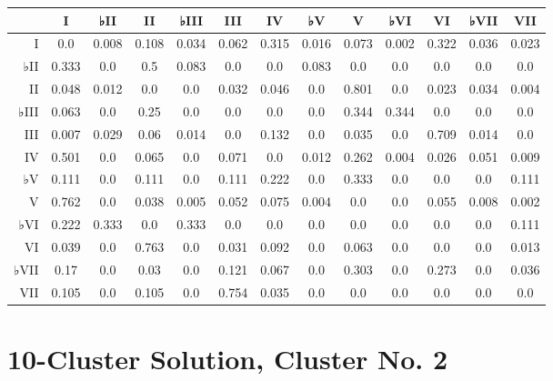 \begin{table}[htbp]
\begin{minipage}{\linewidth}
\setlength{\tymax}{0.5\linewidth}
\centering
\small
\begin{tabulary}{\textwidth}{@{}RCCCCCCCCCCCC@{}} \toprule
&I&♭II&II&♭III&III&IV&♭V&V&♭VI&VI&♭VII&VII\\
\midrule
I&0.0&0.008&0.108&0.034&0.062&0.315&0.016&0.073&0.002&0.322&0.036&0.023\\
♭II&0.333&0.0&0.5&0.083&0.0&0.0&0.083&0.0&0.0&0.0&0.0&0.0\\
II&0.048&0.012&0.0&0.0&0.032&0.046&0.0&0.801&0.0&0.023&0.034&0.004\\
♭III&0.063&0.0&0.25&0.0&0.0&0.0&0.0&0.344&0.344&0.0&0.0&0.0\\
III&0.007&0.029&0.06&0.014&0.0&0.132&0.0&0.035&0.0&0.709&0.014&0.0\\
IV&0.501&0.0&0.065&0.0&0.071&0.0&0.012&0.262&0.004&0.026&0.051&0.009\\
♭V&0.111&0.0&0.111&0.0&0.111&0.222&0.0&0.333&0.0&0.0&0.0&0.111\\
V&0.762&0.0&0.038&0.005&0.052&0.075&0.004&0.0&0.0&0.055&0.008&0.002\\
♭VI&0.222&0.333&0.0&0.333&0.0&0.0&0.0&0.0&0.0&0.0&0.0&0.111\\
VI&0.039&0.0&0.763&0.0&0.031&0.092&0.0&0.063&0.0&0.0&0.0&0.013\\
♭VII&0.17&0.0&0.03&0.0&0.121&0.067&0.0&0.303&0.0&0.273&0.0&0.036\\
VII&0.105&0.0&0.105&0.0&0.754&0.035&0.0&0.0&0.0&0.0&0.0&0.0\\

\bottomrule

\end{tabulary}
\end{minipage}
\end{table}

\section{10-Cluster Solution, Cluster No. 2}
\label{10-clustersolutionclusterno.2}

